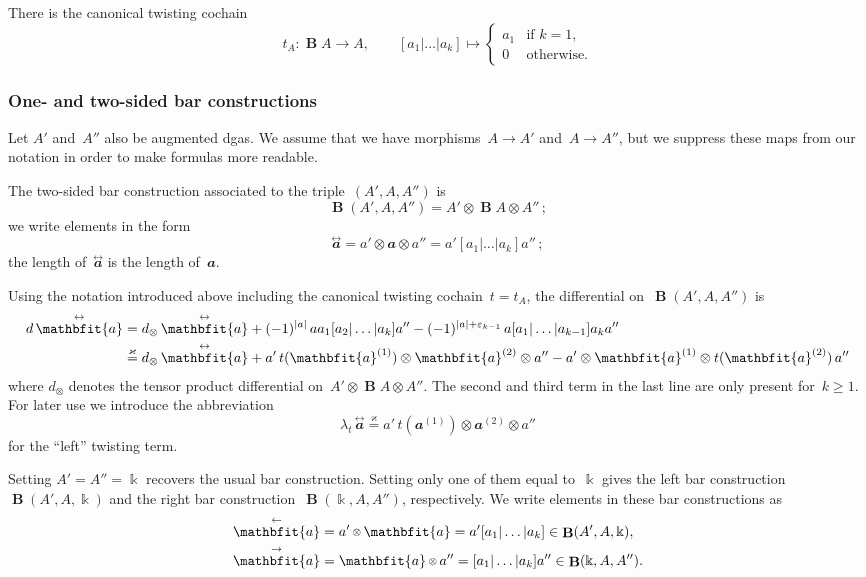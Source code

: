 \documentclass[letterpaper]{amsart}
\numberwithin{equation}{section}
\theoremstyle{plain}
\theoremstyle{definition}
\theoremstyle{remark}
\let\epsilon\varepsilon
\def\smallotimes{\mathbin{\mkern-1mu\vcenter{\hbox{$\scriptstyle\otimes$}}\mkern-1mu}}
\DeclareMathOperator{\BB}{\mathbf{B}}
\def\kk{\Bbbk}
\def\deg#1{|#1|}
\def\aa{\mathbfit{a}}
\def\laa{\overset{\text{$\leftarrow$}}{\aa}}
\def\raa{\overset{\text{$\rightarrow$}}{\aa}}
\def\taa{\overset{\text{$\leftrightarrow$}}{\aa}}
\def\ldd{\lambda_{t}}
\def\swee#1#2{#1^{(#2)}}
\let\KS\varkappa
\def\eqKS{\stackrel{\KS}{=}}
\begin{document}
There is the canonical twisting cochain
\begin{equation}
  t_{A}\colon \BB A\to A,
  \qquad
  [a_{1}|\dots|a_{k}] \mapsto \begin{cases}
    a_{1} & \text{if $k=1$,} \\
    0 & \text{otherwise.}
  \end{cases}
\end{equation}

\subsubsection{One- and two-sided bar constructions}

Let $A'$ and~$A''$ also be augmented dgas. We assume that we have morphisms~$A\to A'$ and~$A\to A''$,
but we suppress these maps from our notation in order to make formulas more readable.

The two-sided bar construction associated to the triple~$(A',A,A'') $ is
\begin{equation}
  \BB(A',A,A'') = A' \otimes \BB A \otimes A'' \,;
\end{equation}
we write elements in the form
\begin{equation}
  \taa = a'\otimes\aa\otimes a'' = a'[a_{1}|\dots|a_{k}]a'' \,;
\end{equation}
the length of~$\taa$ is the length of~$\aa$.

Using the notation introduced above including the canonical twisting cochain~$t=t_{A}$,
the differential on~$\BB(A',A,A'')$ is
\begin{align}
  d\,\taa
  &= d_{\otimes}\,\taa + (-1)^{\deg{a}}\,a a_{1}[a_{2}|\dots|a_{k}]a'' - (-1)^{\deg{a}+\epsilon_{k-1}}\,a[a_{1}|\dots|a_{k-1}]a_{k} a'' \\
  \notag &\eqKS d_{\otimes}\,\taa
  + a'\,t(\swee{\aa}{1})\otimes\swee{\aa}{2}\otimes a'' - a'\otimes\swee{\aa}{1}\otimes t(\swee{\aa}{2})\,a''
\end{align}
where $d_{\otimes}$ denotes the tensor product differential on~$A' \otimes \BB A \otimes A''$. The second and third
term in the last line are only present for~$k\ge1$. For later use we introduce the abbreviation
\begin{equation}
  \label{eq:def-ldd}
  \ldd\,\taa \eqKS a'\,t(\swee{\aa}{1})\otimes\swee{\aa}{2}\otimes a''
\end{equation}
for the ``left'' twisting term.

Setting $A'=A''=\kk$ recovers the usual bar construction. Setting only one of them equal to~$\kk$ gives
the left bar construction~$\BB(A',A,\kk)$ and the right bar construction~$\BB(\kk,A,A'')$, respectively.
We write elements in these bar constructions as
\begin{align}
  \laa &= a'\smallotimes\aa = a'[a_{1}|\dots|a_{k}] \in \BB(A',A,\kk), \\
  \raa &= \aa\smallotimes a'' = [a_{1}|\dots|a_{k}]a'' \in \BB(\kk,A,A'').
\end{align}
\end{document}
